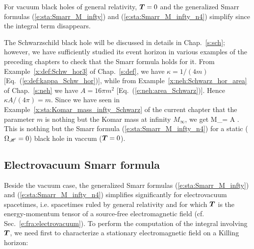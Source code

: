 For vacuum black holes of general relativity, $\bm{T} = 0$ and the generalized Smarr formulas (\ref{e:sta:Smarr_M_infty})
and (\ref{e:sta:Smarr_M_infty_n4}) simplify since the integral
term disappears.

\begin{example}
The Schwarzschild black hole will be discussed in details in Chap.~\ref{s:sch};
however, we have sufficiently studied its event horizon in various examples
of the preceding chapters to check that the Smarr formula holds
for it. From Example~\ref{x:def:Schw_hor3} of Chap.~\ref{s:def}, we have
$\kappa = 1/(4 m)$ [Eq.~(\ref{e:def:kappa_Schw_hor})], while from
Example~\ref{x:neh:Schwarz_hor_area} of Chap.~\ref{s:neh} we have
$A = 16\pi m^2$ [Eq.~(\ref{e:neh:area_Schwarz})]. Hence
$\kappa A / (4\pi) = m$. Since we have seen in Example~\ref{x:sta:Komar_mass_infty_Schwarz}
of the current chapter that the parameter $m$ is nothing but the Komar mass
at infinity $M_\infty$, we get
\be
    M_\infty = \frac{\kappa}{4\pi} A .
\ee
This is nothing but the Smarr formula (\ref{e:sta:Smarr_M_infty_n4})
for a static ($\Omega_{\mathscr{H}} = 0$) black hole in vaccum ($\bm{T}=0$).
\end{example}

\subsection{Electrovacuum Smarr formula} \label{s:sta:Smarr_electrovac}

Beside the vacuum case, the generalized Smarr formulas (\ref{e:sta:Smarr_M_infty})
and (\ref{e:sta:Smarr_M_infty_n4}) simplifies significantly for
electrovacuum spacetimes, i.e. spacetimes ruled by general relativity and
for which $\bm{T}$ is the energy-momentum
tensor of a source-free electromagnetic field (cf. Sec.~\ref{e:fra:electrovacuum}).
To perform the computation of the integral involving $\bm{T}$,
we need first to characterize a stationary electromagnetic field on
a Killing horizon:

